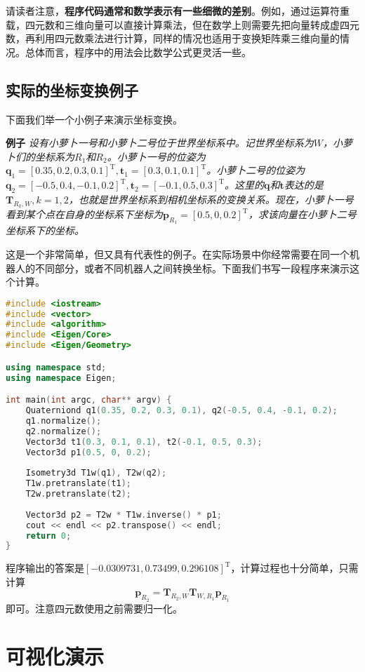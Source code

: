 请读者注意，\textbf{程序代码通常和数学表示有一些细微的差别}。例如，通过运算符重载，四元数和三维向量可以直接计算乘法，但在数学上则需要先把向量转成虚四元数，再利用四元数乘法进行计算，同样的情况也适用于变换矩阵乘三维向量的情况。总体而言，程序中的用法会比数学公式更灵活一些。

\subsection{实际的坐标变换例子}
下面我们举一个小例子来演示坐标变换。

\noindent \textbf{例子} \quad \emph{设有小萝卜一号和小萝卜二号位于世界坐标系中。记世界坐标系为$W$，小萝卜们的坐标系为$R_1$和$R_2$。小萝卜一号的位姿为$\bm{q}_1 = [ 0.35, 0.2, 0.3, 0.1 ]^\mathrm{T}, \bm{t}_1 = [0.3, 0.1, 0.1]^\mathrm{T}$。小萝卜二号的位姿为$\bm{q}_2 = [ -0.5, 0.4, -0.1, 0.2 ]^\mathrm{T}, \bm{t}_2 = [-0.1, 0.5, 0.3]^\mathrm{T}$。这里的$\bm{q}$和$\bm{t}$表达的是$\bm{T}_{R_k, W},k=1,2$，也就是世界坐标系到相机坐标系的变换关系。现在，小萝卜一号看到某个点在自身的坐标系下坐标为$\bm{p}_{R_1} = [0.5,0,0.2]^\mathrm{T}$，求该向量在小萝卜二号坐标系下的坐标。}

这是一个非常简单，但又具有代表性的例子。在实际场景中你经常需要在同一个机器人的不同部分，或者不同机器人之间转换坐标。下面我们书写一段程序来演示这个计算。

\begin{lstlisting}[language=c++,caption=slambook2/ch3/examples/coordinateTransform.cpp]
#include <iostream>
#include <vector>
#include <algorithm>
#include <Eigen/Core>
#include <Eigen/Geometry>

using namespace std;
using namespace Eigen;

int main(int argc, char** argv) {
    Quaterniond q1(0.35, 0.2, 0.3, 0.1), q2(-0.5, 0.4, -0.1, 0.2);
    q1.normalize();
    q2.normalize();
    Vector3d t1(0.3, 0.1, 0.1), t2(-0.1, 0.5, 0.3);
    Vector3d p1(0.5, 0, 0.2);
    
    Isometry3d T1w(q1), T2w(q2);
    T1w.pretranslate(t1);
    T2w.pretranslate(t2);
    
    Vector3d p2 = T2w * T1w.inverse() * p1;
    cout << endl << p2.transpose() << endl;
    return 0;
}
\end{lstlisting}

程序输出的答案是$[-0.0309731,0.73499,0.296108]^\mathrm{T}$，计算过程也十分简单，只需计算$$\bm{p}_{R_2} = \bm{T}_{R_2,W}\bm{T}_{W, R_1} \bm{p}_{R_1}$$即可。注意四元数使用之前需要归一化。

\section{可视化演示}
